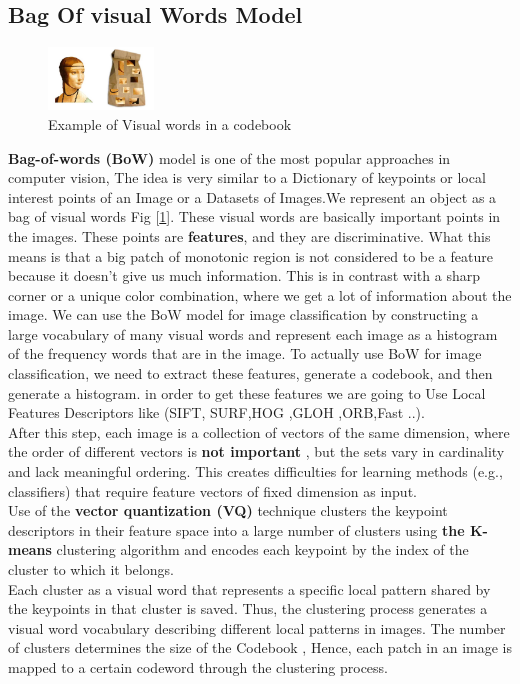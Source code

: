 \subsection{  Bag Of visual Words Model}

\begin{figure}
\includegraphics[width=0.25\textwidth]{img/codebook.jpg}
\caption{Example of Visual words in a codebook}
\label{fig:coodbook}
\end{figure}

 \textbf{Bag-of-words (BoW) } model is one of the most popular approaches in  computer vision, The idea is very similar to a Dictionary of keypoints or local interest points of an Image or a Datasets of Images.We represent an object as a bag of visual words Fig [\ref{fig:coodbook}].
 These visual words are basically important points in the images. These points are \textbf{features}, and they are discriminative. What this means is that a big patch of monotonic region is not considered to be a feature because it doesn’t give us much information. This is in contrast with a sharp corner or a unique color combination, where we get a lot of information about the image. We can use the BoW model for image classification by constructing a large vocabulary of many visual words and represent each image as a histogram of the frequency words that are in the image. To actually use BoW for image classification, we need to extract these features, generate a codebook, and then generate a histogram. in order to get these features we are going to Use Local Features Descriptors like (SIFT, SURF,HOG ,GLOH ,ORB,Fast ..).\\ After this step, each image is a collection of vectors of the same dimension, where the order of different vectors is\textbf{ not important} , but the sets vary in cardinality and lack meaningful ordering. This creates difficulties for learning methods (e.g., classifiers) that require feature vectors of fixed dimension as input.\\ Use of the \textbf{vector quantization (VQ)} technique clusters the keypoint descriptors in their feature space into a large number of clusters using \textbf{the K-means } clustering algorithm and encodes each keypoint by the index of the cluster to which it belongs.\\ Each cluster as a visual word that represents a specific local pattern shared by the keypoints in that cluster is saved. Thus, the clustering process generates a visual word vocabulary describing different local patterns in images. The number of clusters determines the size of the Codebook , Hence, each patch in an image is mapped to a certain codeword through the clustering process.


